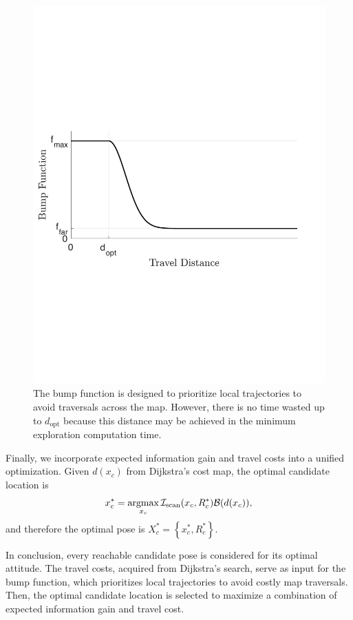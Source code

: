 \documentclass[conf]{new-aiaa}
\newcommand{\braces}[1]{\ensuremath{\left\{ #1 \right\}}}
\newcommand{\argmax}{\operatornamewithlimits{argmax}}
\begin{document}
	\begin{figure}
	\vspace*{-0.3\columnwidth}
		\centerline{
			\includegraphics[width=0.6\columnwidth]{recedingHorizonBumpFunFlattened.pdf}
		}
	\vspace*{-0.25\columnwidth}
		\caption{The bump function is designed to prioritize local trajectories to avoid traversals across the map. However, there is no time wasted up to $d_\text{opt}$ because this distance may be achieved in the minimum exploration computation time.}
		\label{fig:recedingHorizonBumpFun}
	\end{figure}

Finally, we incorporate expected information gain and travel costs into a unified optimization. Given $d(x_c)$ from Dijkstra's cost map, the optimal candidate location is
\begin{align}
\label{eqn:CandidateLocationOptimization}
x_c^*=\argmax_{x_c}\mathcal{I}_\text{scan}(x_c,R_c^*)\mathcal B(d(x_c)),
\end{align}
and therefore the optimal pose is $X_c^*=\braces{x_c^*,R_c^*}$.

In conclusion, every reachable candidate pose is considered for its optimal attitude. The travel costs, acquired from Dijkstra's search, serve as input for the bump function, which prioritizes local trajectories to avoid costly map traversals. Then, the optimal candidate location is selected to maximize a combination of expected information gain and travel cost.


\end{document}
